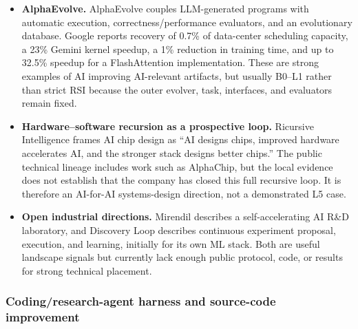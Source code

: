 \begin{itemize}
  \item \textbf{AlphaEvolve.}
  AlphaEvolve couples LLM-generated programs with automatic execution,
  correctness/performance evaluators, and an evolutionary database. Google
  reports recovery of 0.7\% of data-center scheduling capacity, a 23\% Gemini
  kernel speedup, a 1\% reduction in training time, and up to 32.5\% speedup for
  a FlashAttention implementation. These are strong examples of AI improving
  AI-relevant artifacts, but usually B0--L1 rather than strict RSI because the
  outer evolver, task, interfaces, and evaluators remain fixed.

  \item \textbf{Hardware--software recursion as a prospective loop.}
  Ricursive Intelligence frames AI chip design as ``AI designs chips, improved
  hardware accelerates AI, and the stronger stack designs better chips.'' The
  public technical lineage includes work such as AlphaChip, but the local
  evidence does not establish that the company has closed this full recursive
  loop. It is therefore an AI-for-AI systems-design direction, not a demonstrated
  L5 case.

  \item \textbf{Open industrial directions.}
  Mirendil describes a self-accelerating AI R\&D laboratory, and Discovery Loop
  describes continuous experiment proposal, execution, and learning, initially
  for its own ML stack. Both are useful landscape signals but currently lack
  enough public protocol, code, or results for strong technical placement.
\end{itemize}

\subsubsection{Coding/research-agent harness and source-code improvement}

